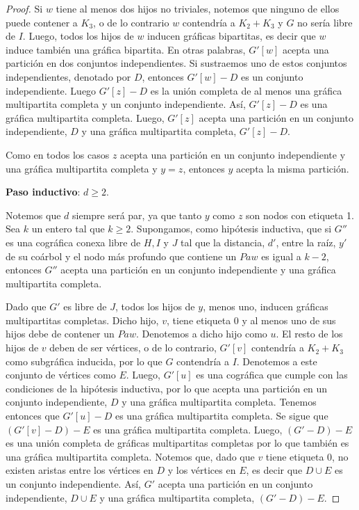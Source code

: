 \begin{proof}
  Si $w$ tiene al menos dos hijos no triviales, notemos que ninguno de
  ellos puede contener a $K_3$, o de lo contrario $w$ contendría a $K_2+K_3$
  y $G$ no sería libre de $I$. Luego, todos los hijos de $w$ inducen gráficas
  bipartitas, es decir que $w$ induce también una gráfica bipartita. En otras
  palabras, $G'[w]$ acepta una partición en dos conjuntos independientes. Si
  sustraemos uno de estos conjuntos independientes, denotado por $D$, entonces
  $G'[w]-D$ es un conjunto independiente. Luego $G'[z]-D$ es la unión completa
  de al menos una gráfica multipartita completa y un conjunto independiente.
  Así, $G'[z]-D$ es una gráfica multipartita completa. Luego, $G'[z]$ acepta
  una partición en un conjunto independiente, $D$ y una gráfica multipartita
  completa, $G'[z] - D$.

  Como en todos los casos $z$ acepta una partición en un conjunto
  independiente y una gráfica multipartita completa y $y = z$, entonces $y$
  acepta la misma partición.

  \textbf{Paso inductivo}: $d \ge 2$.

  Notemos que $d$ siempre será par, ya que tanto $y$ como $z$ son nodos con
  etiqueta 1. Sea $k$ un entero tal que $k \ge 2$. Supongamos, como hipótesis
  inductiva, que si $G''$ es una cográfica conexa libre de $H, I$ y $J$ tal
  que la distancia, $d'$, entre la raíz, $y'$ de su coárbol y el nodo más
  profundo que contiene un $Paw$ es igual a $k-2$, entonces $G''$ acepta una
  partición en un conjunto independiente y una gráfica multipartita completa.

  Dado que $G'$ es libre de $J$, todos los hijos de $y$, menos uno, inducen
  gráficas multipartitas completas. Dicho hijo, $v$, tiene etiqueta 0 y al
  menos uno de sus hijos debe de contener un $Paw$. Denotemos a dicho hijo
  como $u$. El resto de los hijos de $v$ deben de ser vértices, o de lo
  contrario, $G'[v]$ contendría a $K_2 + K_3$ como subgráfica inducida, por
  lo que $G$ contendría a $I$. Denotemos a este conjunto de vértices como
  $E$. Luego, $G'[u]$  es una cográfica que cumple con las condiciones de
  la hipótesis inductiva, por lo que acepta una partición en un conjunto
  independiente, $D$ y una gráfica multipartita completa. Tenemos entonces
  que $G'[u] - D$ es una gráfica multipartita completa. Se sigue que
  $(G'[v]-D)-E$ es una gráfica multipartita completa. Luego, $(G'-D)-E$ es
  una unión completa de gráficas multipartitas completas por lo que también
  es una gráfica multipartita completa. Notemos que, dado que $v$ tiene
  etiqueta 0, no existen aristas entre los vértices en $D$ y los vértices en
  $E$, es decir que $D \cup E$ es un conjunto independiente. Así, $G'$ acepta
  una partición en un conjunto independiente, $D \cup E$ y una gráfica
  multipartita completa, $(G' - D) - E$.


\end{proof}
